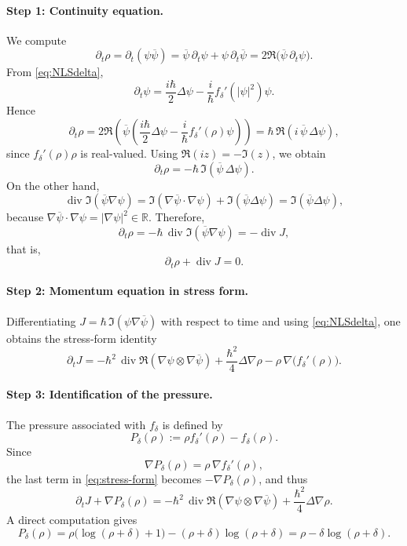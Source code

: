 \documentclass[11pt]{article}
\begin{document}
\paragraph{Step 1: Continuity equation.}
We compute
\[
\partial_t\rho
=
\partial_t(\psi\overline{\psi})
=
\overline{\psi}\,\partial_t\psi+\psi\,\partial_t\overline{\psi}
=
2\Re\bigl(\overline{\psi}\,\partial_t\psi\bigr).
\]
From \eqref{eq:NLSdelta},
\[
\partial_t\psi
=
\frac{i\hbar}{2}\Delta\psi-\frac{i}{\hbar}f_\delta'(|\psi|^2)\psi.
\]
Hence
\[
\partial_t\rho
=
2\Re\left(
\overline{\psi}\left(\frac{i\hbar}{2}\Delta\psi-\frac{i}{\hbar}f_\delta'(\rho)\psi\right)
\right)
=
\hbar\,\Re(i\,\overline{\psi}\,\Delta\psi),
\]
since \(f_\delta'(\rho)\rho\) is real-valued. Using \(\Re(i z)=-\Im(z)\), we obtain
\[
\partial_t\rho=-\hbar\,\Im(\overline{\psi}\,\Delta\psi).
\]
On the other hand,
\[
\operatorname{div}\Im(\overline{\psi}\nabla\psi)
=
\Im(\nabla\overline{\psi}\cdot\nabla\psi)+\Im(\overline{\psi}\Delta\psi)
=
\Im(\overline{\psi}\Delta\psi),
\]
because \(\nabla\overline{\psi}\cdot\nabla\psi=|\nabla\psi|^2\in\mathbb{R}\). Therefore,
\[
\partial_t\rho
=
-\hbar\,\operatorname{div}\Im(\overline{\psi}\nabla\psi)
=
-\operatorname{div}J,
\]
that is,
\begin{equation}\label{eq:cont-formal}
\partial_t\rho+\operatorname{div}J=0.
\end{equation}

\paragraph{Step 2: Momentum equation in stress form.}
Differentiating \(J=\hbar\,\Im(\psi\nabla\overline{\psi})\) with respect to time and using \eqref{eq:NLSdelta}, one obtains the stress-form identity
\begin{equation}\label{eq:stress-form}
\partial_t J
=
-\hbar^2\,\operatorname{div}\Re(\nabla\psi\otimes\nabla\overline{\psi})
+\frac{\hbar^2}{4}\Delta\nabla\rho
-\rho\,\nabla\bigl(f_\delta'(\rho)\bigr).
\end{equation}

\paragraph{Step 3: Identification of the pressure.}
The pressure associated with \(f_\delta\) is defined by
\begin{equation}\label{eq:Pdelta}
P_\delta(\rho):=\rho f_\delta'(\rho)-f_\delta(\rho).
\end{equation}
Since
\[
\nabla P_\delta(\rho)=\rho\,\nabla f_\delta'(\rho),
\]
the last term in \eqref{eq:stress-form} becomes \(-\nabla P_\delta(\rho)\), and thus
\begin{equation}\label{eq:stress-form-P}
\partial_t J+\nabla P_\delta(\rho)
=
-\hbar^2\,\operatorname{div}\Re(\nabla\psi\otimes\nabla\overline{\psi})
+\frac{\hbar^2}{4}\Delta\nabla\rho.
\end{equation}
A direct computation gives
\[
P_\delta(\rho)
=
\rho\bigl(\log(\rho+\delta)+1\bigr)-(\rho+\delta)\log(\rho+\delta)
=
\rho-\delta\log(\rho+\delta).
\]
\end{document}
